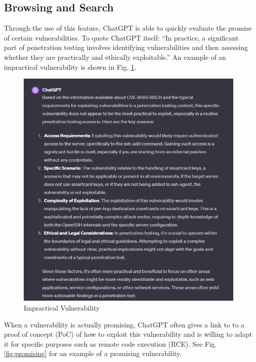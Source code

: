 \documentclass[conference]{IEEEtran}
\begin{document}
\subsection{Browsing and Search}
Through the use of this feature, ChatGPT is able to quickly evaluate the promise of certain vulnerabilities. To quote ChatGPT itself:  ``In practice, a significant part of penetration testing involves identifying vulnerabilities and then assessing whether they are practically and ethically exploitable.'' An example of an impractical vulnerability is shown in Fig. \ref{fig:impractical}. \begin{figure}[htbp]
  \centering
  \includegraphics[width=\columnwidth]{search1.png}
  \caption{Impractical Vulnerability}
  \label{fig:impractical}
\end{figure} 
When a vulnerability is actually promising, ChatGPT often gives a link to to a proof of concept (PoC) of how to exploit this vulnerability and is willing to adapt it for specific purposes such as remote code execution (RCE). See Fig. \ref{fig:promising} for an example of a promising vulnerability.
\end{document}
